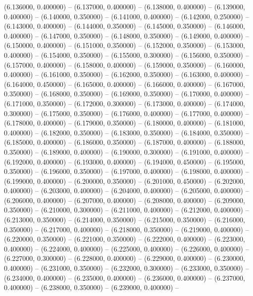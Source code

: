 (6.136000, 0.400000) -- 
(6.137000, 0.400000) -- 
(6.138000, 0.400000) -- 
(6.139000, 0.400000) -- 
(6.140000, 0.350000) -- 
(6.141000, 0.400000) -- 
(6.142000, 0.250000) -- 
(6.143000, 0.400000) -- 
(6.144000, 0.350000) -- 
(6.145000, 0.350000) -- 
(6.146000, 0.400000) -- 
(6.147000, 0.350000) -- 
(6.148000, 0.350000) -- 
(6.149000, 0.400000) -- 
(6.150000, 0.400000) -- 
(6.151000, 0.350000) -- 
(6.152000, 0.350000) -- 
(6.153000, 0.400000) -- 
(6.154000, 0.350000) -- 
(6.155000, 0.300000) -- 
(6.156000, 0.350000) -- 
(6.157000, 0.400000) -- 
(6.158000, 0.400000) -- 
(6.159000, 0.350000) -- 
(6.160000, 0.400000) -- 
(6.161000, 0.350000) -- 
(6.162000, 0.350000) -- 
(6.163000, 0.400000) -- 
(6.164000, 0.450000) -- 
(6.165000, 0.400000) -- 
(6.166000, 0.400000) -- 
(6.167000, 0.350000) -- 
(6.168000, 0.350000) -- 
(6.169000, 0.350000) -- 
(6.170000, 0.400000) -- 
(6.171000, 0.350000) -- 
(6.172000, 0.300000) -- 
(6.173000, 0.400000) -- 
(6.174000, 0.300000) -- 
(6.175000, 0.350000) -- 
(6.176000, 0.400000) -- 
(6.177000, 0.400000) -- 
(6.178000, 0.400000) -- 
(6.179000, 0.350000) -- 
(6.180000, 0.400000) -- 
(6.181000, 0.400000) -- 
(6.182000, 0.350000) -- 
(6.183000, 0.350000) -- 
(6.184000, 0.350000) -- 
(6.185000, 0.400000) -- 
(6.186000, 0.350000) -- 
(6.187000, 0.400000) -- 
(6.188000, 0.350000) -- 
(6.189000, 0.400000) -- 
(6.190000, 0.300000) -- 
(6.191000, 0.400000) -- 
(6.192000, 0.400000) -- 
(6.193000, 0.400000) -- 
(6.194000, 0.450000) -- 
(6.195000, 0.350000) -- 
(6.196000, 0.350000) -- 
(6.197000, 0.400000) -- 
(6.198000, 0.400000) -- 
(6.199000, 0.400000) -- 
(6.200000, 0.350000) -- 
(6.201000, 0.450000) -- 
(6.202000, 0.400000) -- 
(6.203000, 0.400000) -- 
(6.204000, 0.400000) -- 
(6.205000, 0.400000) -- 
(6.206000, 0.400000) -- 
(6.207000, 0.400000) -- 
(6.208000, 0.400000) -- 
(6.209000, 0.350000) -- 
(6.210000, 0.300000) -- 
(6.211000, 0.400000) -- 
(6.212000, 0.400000) -- 
(6.213000, 0.350000) -- 
(6.214000, 0.350000) -- 
(6.215000, 0.350000) -- 
(6.216000, 0.350000) -- 
(6.217000, 0.400000) -- 
(6.218000, 0.350000) -- 
(6.219000, 0.400000) -- 
(6.220000, 0.350000) -- 
(6.221000, 0.350000) -- 
(6.222000, 0.400000) -- 
(6.223000, 0.400000) -- 
(6.224000, 0.400000) -- 
(6.225000, 0.400000) -- 
(6.226000, 0.400000) -- 
(6.227000, 0.300000) -- 
(6.228000, 0.400000) -- 
(6.229000, 0.400000) -- 
(6.230000, 0.400000) -- 
(6.231000, 0.350000) -- 
(6.232000, 0.300000) -- 
(6.233000, 0.350000) -- 
(6.234000, 0.400000) -- 
(6.235000, 0.400000) -- 
(6.236000, 0.400000) -- 
(6.237000, 0.400000) -- 
(6.238000, 0.350000) -- 
(6.239000, 0.400000) -- 
